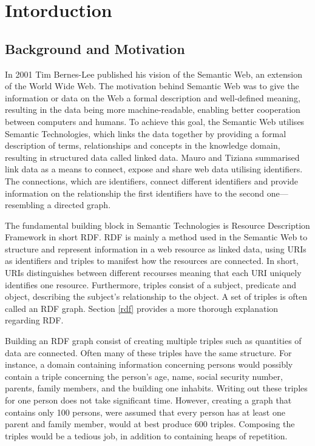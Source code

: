 
\chapter{Intorduction}

\section{Background and Motivation}
In 2001 Tim Bernes-Lee published his vision of the Semantic Web, an extension of the World Wide Web\cite{Berner-Lee_The_samantic_web}. The motivation behind Semantic Web was to give the information or data on the Web a formal description and well-defined meaning, resulting in the data being more machine-readable, enabling better cooperation between computers and humans\cite{Berner-Lee_The_samantic_web}. To achieve this goal, the Semantic Web utilises Semantic Technologies, which links the data together by providing a formal description of terms, relationships and concepts in the knowledge domain, resulting in structured data called linked data. Mauro and Tiziana summarised link data as a means to connect, expose and share web data utilising identifiers\cite{Mauro_Tiziana_linked_data}. The connections, which are identifiers, connect different identifiers and provide information on the relationship the first identifiers have to the second one—resembling a directed graph. 

\para
The fundamental building block in Semantic Technologies is Resource Description Framework in short RDF\cite{W3C_RDF}. RDF is mainly a method used in the Semantic Web to structure and represent information in a web resource as linked data, using URIs as identifiers and triples to manifest how the resources are connected. In short, URIs distinguishes between different recourses meaning that each URI uniquely identifies one resource. Furthermore, triples consist of a subject, predicate and object, describing the subject's relationship to the object. A set of triples is often called an RDF graph. Section \ref{rdf} provides a more thorough explanation regarding RDF.

\para
Building an RDF graph consist of creating multiple triples such as quantities of data are connected. Often many of these triples have the same structure. For instance, a domain containing information concerning persons would possibly contain a triple concerning the person's age, name, social security number, parents, family members, and the building one inhabits. Writing out these triples for one person does not take significant time. However, creating a graph that contains only 100 persons, were assumed that every person has at least one parent and family member, would at best produce 600 triples. Composing the triples would be a tedious job, in addition to containing heaps of repetition.

